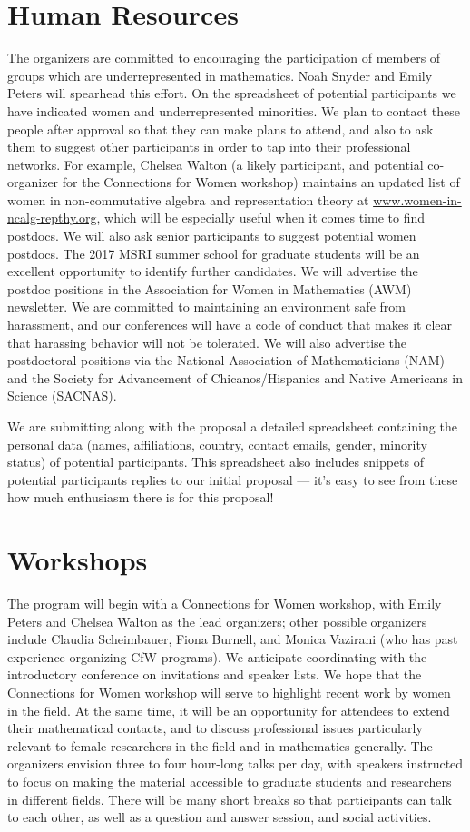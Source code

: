 \documentclass[12pt]{article}
\begin{document}
\section{Human Resources}
The organizers are committed to encouraging the participation of members of groups which are underrepresented in mathematics. Noah Snyder and Emily Peters will spearhead this effort. On the spreadsheet of potential participants we have indicated women and underrepresented minorities. We plan to contact these people after approval so that they can make plans to attend, and also to ask them to suggest other participants in order to tap into their professional networks. For example, Chelsea Walton (a likely participant, and potential co-organizer for the Connections for Women workshop) maintains an updated list of women in non-commutative algebra and representation theory at \url{www.women-in-ncalg-repthy.org}, which will be especially useful when it comes time to find postdocs. We will also ask senior participants to suggest potential women postdocs. The 2017 MSRI summer school for graduate students will be an excellent opportunity to identify further candidates. We will advertise the postdoc positions in the Association for Women in Mathematics (AWM) newsletter.  We are committed to maintaining an environment safe from harassment, and our conferences will have a code of conduct that makes it clear that harassing behavior will not be tolerated.  We will also advertise the postdoctoral positions via the National Association of Mathematicians (NAM) and the Society for Advancement of Chicanos/Hispanics and Native Americans in Science (SACNAS).

We are submitting along with the proposal a detailed spreadsheet containing the personal data (names, affiliations, country, contact emails, gender, minority status) of potential participants. This spreadsheet also includes snippets of potential participants replies to our initial proposal --- it's easy to see from these how much enthusiasm there is for this proposal!


\section{Workshops}
The program will begin with a Connections for Women workshop, with Emily Peters and Chelsea Walton as the lead organizers; other possible organizers include Claudia Scheimbauer, Fiona Burnell, and Monica Vazirani (who has past experience organizing CfW programs). We anticipate coordinating with the introductory conference on invitations and speaker lists.  We hope that the Connections for Women workshop will serve to highlight recent work by women in the field. At the same time, it will be an opportunity for attendees to extend their mathematical contacts, and to discuss professional issues particularly relevant to female researchers in the field and in mathematics generally.  The organizers envision three to four hour-long talks per day, with speakers instructed to focus on making the material accessible to graduate students and researchers in different fields.  There will be many short breaks so that participants can talk to each other, as well as a question and answer session, and social activities.
\end{document}
